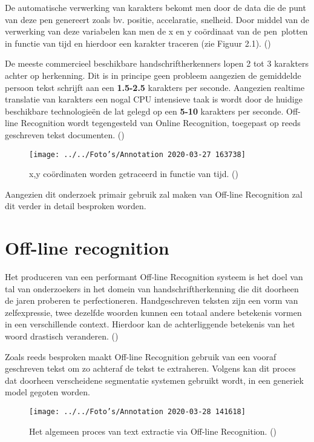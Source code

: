 De automatische verwerking van karakters bekomt men door de data die de punt van deze pen genereert zoals bv. positie, accelaratie, snelheid. Door middel van de verwerking van deze variabelen kan men de x en y coördinaat van de pen plotten in functie van tijd en hierdoor een karakter traceren (zie Figuur 2.1). (\cite{RejeanPlamondon2000})





De meeste commercieel beschikbare handschriftherkenners lopen 2 tot 3 karakters achter op herkenning. Dit is in principe geen probleem aangezien de gemiddelde persoon tekst schrijft aan een \textbf{1.5-2.5} karakters per seconde. Aangezien realtime translatie van karakters een nogal CPU intensieve taak is wordt door de huidige beschikbare technologieën de lat gelegd op een \textbf{5-10} karakters per seconde. Off-line Recognition wordt tegengesteld van Online Recognition, toegepast op reeds geschreven tekst documenten. (\cite{Tappert1990})  

\begin{figure}[h]
	\texttt{[image: ../../Foto's/Annotation 2020-03-27 163738]}
	\caption{x,y coördinaten worden getraceerd in functie van tijd. (\cite{RejeanPlamondon2000})}
	\centering
\end{figure}

Aangezien dit onderzoek primair gebruik zal maken van Off-line Recognition zal dit verder in detail besproken worden.

\section{Off-line recognition}
Het produceren van een performant Off-line Recognition systeem is het doel van tal van onderzoekers in het domein van handschriftherkenning die dit doorheen de jaren proberen te perfectioneren. Handgeschreven teksten zijn een vorm van zelfexpressie, twee dezelfde woorden kunnen een totaal andere betekenis vormen in een verschillende context. Hierdoor kan de achterliggende betekenis van het woord drastisch veranderen. (\cite{GergelyTimar2003})



Zoals reeds besproken maakt Off-line Recognition gebruik van een vooraf geschreven tekst om zo achteraf de tekst te extraheren. Volgens \cite{GergelyTimar2003} kan dit proces dat doorheen verscheidene segmentatie systemen  gebruikt wordt, in een generiek model gegoten worden. 

\begin{figure}[h]
	\texttt{[image: ../../Foto's/Annotation 2020-03-28 141618]}
	\captionsetup{justification=centering,margin=2cm}
    \caption{ Het algemeen proces van text extractie via Off-line Recognition. (\cite{GergelyTimar2003})}

	\centering
\end{figure}

